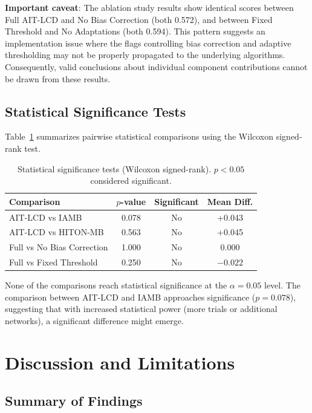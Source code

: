 \documentclass{article}
\theoremstyle{plain}
\theoremstyle{definition}
\begin{document}
\textbf{Important caveat}: The ablation study results show identical scores between Full AIT-LCD and No Bias Correction (both 0.572), and between Fixed Threshold and No Adaptations (both 0.594). This pattern suggests an implementation issue where the flags controlling bias correction and adaptive thresholding may not be properly propagated to the underlying algorithms. Consequently, valid conclusions about individual component contributions cannot be drawn from these results.

\subsection{Statistical Significance Tests}

Table~\ref{tab:statistical_tests} summarizes pairwise statistical comparisons using the Wilcoxon signed-rank test.

\begin{table}[t]
\caption{Statistical significance tests (Wilcoxon signed-rank). $p < 0.05$ considered significant.}
\label{tab:statistical_tests}
\centering
\begin{tabular}{lccc}
\toprule
Comparison & $p$-value & Significant & Mean Diff. \\
\midrule
AIT-LCD vs IAMB & 0.078 & No & +0.043 \\
AIT-LCD vs HITON-MB & 0.563 & No & +0.045 \\
Full vs No Bias Correction & 1.000 & No & 0.000 \\
Full vs Fixed Threshold & 0.250 & No & $-0.022$ \\
\bottomrule
\end{tabular}
\end{table}

None of the comparisons reach statistical significance at the $\alpha = 0.05$ level. The comparison between AIT-LCD and IAMB approaches significance ($p = 0.078$), suggesting that with increased statistical power (more trials or additional networks), a significant difference might emerge.

\section{Discussion and Limitations}\label{sec:discussion}

\subsection{Summary of Findings}
\end{document}
